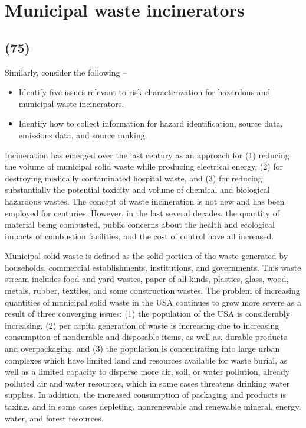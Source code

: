 \documentclass[11pt,a4paper]{article}
\begin{document}
\newpage         
        
\section{Municipal waste incinerators}
\subsection*{(75)}
Similarly, consider the following --
\begin{itemize}
    \item Identify five issues relevant to risk characterization for hazardous and municipal waste incinerators.
    \item Identify how to collect information for hazard identification, source data, emissions data, and source ranking.
\end{itemize}
        
Incineration has emerged over the last century as an approach for (1) reducing the volume of municipal solid waste while producing electrical energy, (2) for destroying medically contaminated hospital waste, and (3) for reducing substantially the potential toxicity and volume of chemical and biological hazardous wastes. The concept of waste incineration is not new and has been employed for centuries. However, in the last several decades, the quantity of material being combusted, public concerns about the health and ecological impacts of combustion facilities, and the cost of control have all increased.

Municipal solid waste is defined as the solid portion of the waste generated by households, commercial establishments, institutions, and governments. This waste stream includes food and yard wastes, paper of all kinds, plastics, glass, wood, metals, rubber, textiles, and some construction wastes. The problem of increasing quantities of municipal solid waste in the USA continues to grow more severe as a result of three converging issues: (1) the population of the USA is considerably increasing, (2) per capita generation of waste is increasing due to increasing consumption of nondurable and disposable items, as well as, durable products and overpackaging, and (3) the population is concentrating into large urban complexes which have limited land and resources available for waste burial, as well as a limited capacity to disperse more air, soil, or water pollution, already polluted air and water resources, which in some cases threatens drinking water supplies. In addition, the increased consumption of packaging and products is taxing, and in some cases depleting, nonrenewable and renewable mineral, energy, water, and forest resources. 
\end{document}
